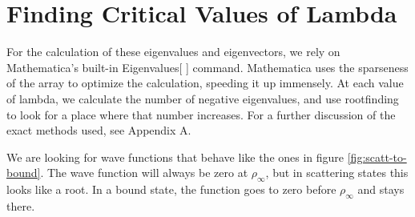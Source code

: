 \documentclass[12pt,twoside]{reedthesis}
\begin{document}
\section{Finding Critical Values of Lambda}
For the calculation of these eigenvalues and eigenvectors, we rely on Mathematica's built-in Eigenvalues[ ] command. Mathematica uses the sparseness of the array to optimize the calculation, speeding it up immensely. At each value of lambda, we calculate the number of negative eigenvalues, and use rootfinding to look for a place where that number increases. For a further discussion of the exact methods used, see Appendix A.

We are looking for wave functions that behave like the ones in figure \ref{fig:scatt-to-bound}. The wave function will always be zero at $\rho_{\infty}$, but in scattering states this looks like a root. In a bound state, the function goes to zero before $\rho_{\infty}$ and stays there. 
\end{document}
